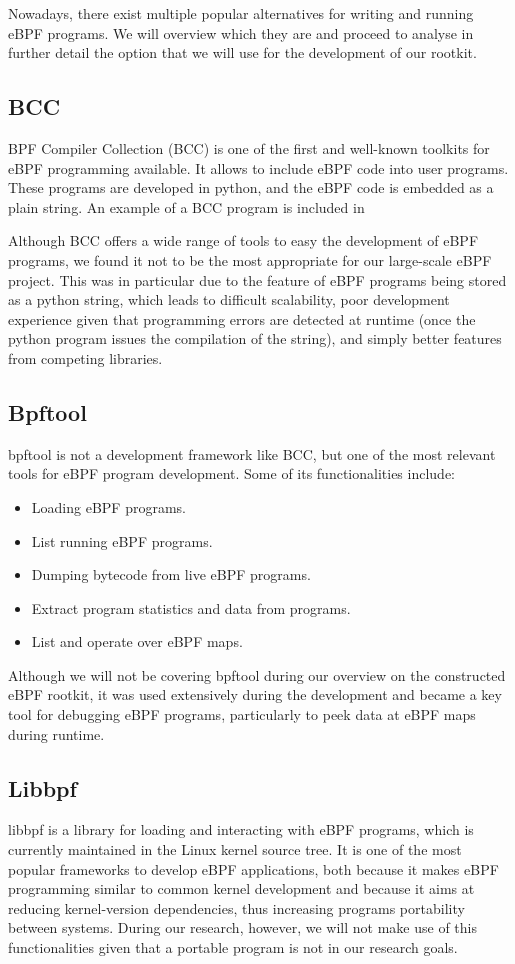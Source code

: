 \documentclass[12pt]{report} %
\begin{document}
Nowadays, there exist multiple popular alternatives for writing and running eBPF programs. We will overview which they are and proceed to analyse in further detail the option that we will use for the development of our rootkit.

\subsection{BCC}
BPF Compiler Collection (BCC) is one of the first and well-known toolkits for eBPF programming available\cite{bcc_github}. It allows to include eBPF code into user programs. These programs are developed in python, and the eBPF code is embedded as a plain string. An example of a BCC program is included in %

Although BCC offers a wide range of tools to easy the development of eBPF programs, we found it not to be the most appropriate for our large-scale eBPF project. This was in particular due to the feature of eBPF programs being stored as a python string, which leads to difficult scalability, poor development experience given that programming errors are detected at runtime (once the python program issues the compilation of the string), and simply better features from competing libraries.

\subsection{Bpftool}
bpftool is not a development framework like BCC, but one of the most relevant tools for eBPF program development. Some of its functionalities include:
\begin{itemize}
\item Loading eBPF programs.
\item List running eBPF programs.
\item Dumping bytecode from live eBPF programs.
\item Extract program statistics and data from programs.
\item List and operate over eBPF maps.
\end{itemize}

Although we will not be covering bpftool during our overview on the constructed eBPF rootkit, it was used extensively during the development and became a key tool for debugging eBPF programs, particularly to peek data at eBPF maps during runtime.

\subsection{Libbpf}
libbpf\cite{libbpf_github} is a library for loading and interacting with eBPF programs, which is currently maintained in the Linux kernel source tree\cite{libbpf_upstream}. It is one of the most popular frameworks to develop eBPF applications, both because it makes eBPF programming similar to common kernel development and because it aims at reducing kernel-version dependencies, thus increasing programs portability between systems\cite{libbpf_core}. During our research, however, we will not make use of this functionalities given that a portable program is not in our research goals.
\end{document}
